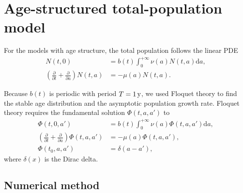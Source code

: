 \documentclass[USenglish]{article}
\newcommand{\md}{\mathrm{d}}
\begin{document}
\appendix


\section{Age-structured total-population model}
\label{appendix_Floquet_theory}

For the models with age structure, the total population follows the
linear PDE
\begin{subequations}
  \begin{align}
    N(t, 0)
    &= b(t) \int_0^{+\infty} \nu(a) N(t, a) \md a,
    \\
    \left(\frac{\partial}{\partial t}
      + \frac{\partial}{\partial a}\right)
    N(t, a)
    &= - \mu(a) N(t, a).
  \end{align}
\end{subequations}

Because $b(t)$ is periodic with period $T = \unit[1]{y}$, we used
Floquet theory \autocite{parker_1992} to find the stable age
distribution and the asymptotic population growth rate. Floquet theory
requires the fundamental solution $\Phi(t, a, a')$ to
\begin{subequations}
  \begin{align}
    \Phi(t, 0, a')
    &= b(t) \int_0^{+\infty} \nu(a) \Phi(t, a, a') \md a,
    \\
    \left(\frac{\partial}{\partial t}
      + \frac{\partial}{\partial a}\right)
    \Phi(t, a, a')
    &= - \mu(a) \Phi(t, a, a'),
    \\
    \Phi(t_0, a, a')
    &= \delta(a - a'),
  \end{align}
\end{subequations}
where $\delta(x)$ is the Dirac delta.


\subsection{Numerical method}
\end{document}
